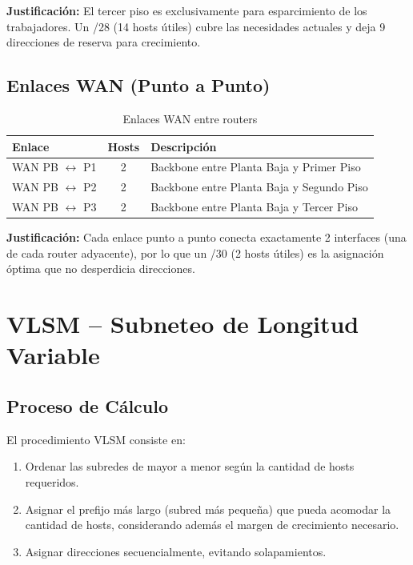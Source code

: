 \documentclass[letterpaper,11pt]{article}
\begin{document}
\textbf{Justificación:} El tercer piso es exclusivamente para esparcimiento de los trabajadores. Un /28 (14 hosts útiles) cubre las necesidades actuales y deja 9 direcciones de reserva para crecimiento.

\subsection{Enlaces WAN (Punto a Punto)}

\begin{table}[H]
\centering
\caption{Enlaces WAN entre routers}
\begin{tabular}{|l|c|l|}
\hline
\textbf{Enlace} & \textbf{Hosts} & \textbf{Descripción} \\
\hline
WAN PB $\leftrightarrow$ P1 & 2 & Backbone entre Planta Baja y Primer Piso \\
WAN PB $\leftrightarrow$ P2 & 2 & Backbone entre Planta Baja y Segundo Piso \\
WAN PB $\leftrightarrow$ P3 & 2 & Backbone entre Planta Baja y Tercer Piso \\
\hline
\end{tabular}
\end{table}

\textbf{Justificación:} Cada enlace punto a punto conecta exactamente 2 interfaces (una de cada router adyacente), por lo que un /30 (2 hosts útiles) es la asignación óptima que no desperdicia direcciones.

\section{VLSM -- Subneteo de Longitud Variable}

\subsection{Proceso de Cálculo}

El procedimiento VLSM consiste en:
\begin{enumerate}
    \item Ordenar las subredes de mayor a menor según la cantidad de hosts requeridos.
    \item Asignar el prefijo más largo (subred más pequeña) que pueda acomodar la cantidad de hosts, considerando además el margen de crecimiento necesario.
    \item Asignar direcciones secuencialmente, evitando solapamientos.
\end{enumerate}
\end{document}
